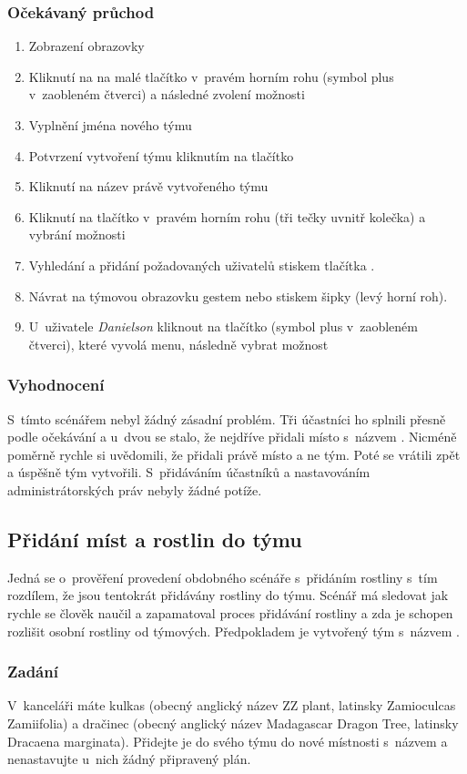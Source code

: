 \documentclass[thesis=M,czech]{FITthesis}[2019/12/23]
\begin{document}
\subsubsection*{Očekávaný průchod}
\begin{enumerate}
    \item Zobrazení obrazovky 
    \item Kliknutí na na malé tlačítko v~pravém horním rohu (symbol plus v~zaobleném čtverci) a následné zvolení možnosti 
    \item Vyplnění jména nového týmu
    \item Potvrzení vytvoření týmu kliknutím na tlačítko 
    \item Kliknutí na název právě vytvořeného týmu
    \item Kliknutí na tlačítko v~pravém horním rohu (tři tečky uvnitř kolečka) a vybrání možnosti 
    \item Vyhledání a přidání požadovaných uživatelů stiskem tlačítka .
    \item Návrat na týmovou obrazovku gestem nebo stiskem šipky (levý horní roh).
    \item U~uživatele \textit{Danielson} kliknout na tlačítko (symbol plus v~zaobleném čtverci), které vyvolá menu, následně vybrat možnost 
\end{enumerate}
\subsubsection*{Vyhodnocení}
S~tímto scénářem nebyl žádný zásadní problém. Tři účastníci ho splnili přesně podle očekávání a u~dvou se stalo, že nejdříve přidali místo s~názvem . Nicméně poměrně rychle si uvědomili, že přidali právě místo a ne tým. Poté se vrátili zpět a úspěšně tým vytvořili. S~přidáváním účastníků a nastavováním administrátorských práv nebyly žádné potíže.

\subsection{Přidání míst a rostlin do týmu}
Jedná se o~prověření provedení obdobného scénáře s~přidáním rostliny s~tím rozdílem, že jsou tentokrát přidávány rostliny do týmu. Scénář má sledovat jak rychle se člověk naučil a zapamatoval proces přidávání rostliny a zda je schopen rozlišit osobní rostliny od týmových. Předpokladem je vytvořený tým s~názvem .
\subsubsection*{Zadání}
V~kanceláři máte kulkas (obecný anglický název ZZ plant, latinsky Zamioculcas Zamiifolia) a dračinec (obecný anglický název Madagascar Dragon Tree, latinsky Dracaena marginata). Přidejte je do svého týmu do nové místnosti s~názvem  a nenastavujte u~nich žádný připravený plán.
\end{document}

